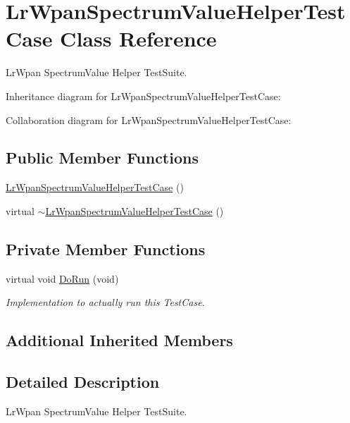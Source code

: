 \hypertarget{classLrWpanSpectrumValueHelperTestCase}{}\section{Lr\+Wpan\+Spectrum\+Value\+Helper\+Test\+Case Class Reference}
\label{classLrWpanSpectrumValueHelperTestCase}


Lr\+Wpan Spectrum\+Value Helper Test\+Suite.  




Inheritance diagram for Lr\+Wpan\+Spectrum\+Value\+Helper\+Test\+Case\+:


Collaboration diagram for Lr\+Wpan\+Spectrum\+Value\+Helper\+Test\+Case\+:
\subsection*{Public Member Functions}
\begin{DoxyCompactItemize}
\item 
\hyperlink{classLrWpanSpectrumValueHelperTestCase_a93440671ee04054b588eb91b957c870a}{Lr\+Wpan\+Spectrum\+Value\+Helper\+Test\+Case} ()
\item 
virtual \hyperlink{classLrWpanSpectrumValueHelperTestCase_a926ea50a0f121c3b652ce65416149c41}{$\sim$\+Lr\+Wpan\+Spectrum\+Value\+Helper\+Test\+Case} ()
\end{DoxyCompactItemize}
\subsection*{Private Member Functions}
\begin{DoxyCompactItemize}
\item 
virtual void \hyperlink{classLrWpanSpectrumValueHelperTestCase_a363a91274d7566a516ee67fe37731c02}{Do\+Run} (void)
\begin{DoxyCompactList}\small\item\em Implementation to actually run this Test\+Case. \end{DoxyCompactList}\end{DoxyCompactItemize}
\subsection*{Additional Inherited Members}


\subsection{Detailed Description}
Lr\+Wpan Spectrum\+Value Helper Test\+Suite. 


